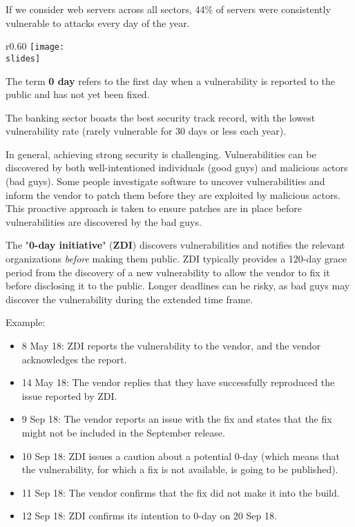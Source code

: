 If we consider web servers across all sectors, 44\% of servers were consistently vulnerable to attacks every day of the year.
\begin{wrapfigure}{r}{0.60\textwidth}
  \centering
      \texttt{[image: \\slides]}
\end{wrapfigure}

The term \textbf{0 day} refers to the first day when a vulnerability is reported to the public and has not yet been fixed.

The banking sector boasts the best security track record, with the lowest vulnerability rate (rarely vulnerable for 30 days or less each year).

In general, achieving strong security is challenging. Vulnerabilities can be discovered by both well-intentioned individuals (good guys) and malicious actors (bad guys). Some people investigate software to uncover vulnerabilities and inform the vendor to patch them before they are exploited by malicious actors. This proactive approach is taken to ensure patches are in place before vulnerabilities are discovered by the bad guys.

The "\textbf{0-day initiative}" (\textbf{ZDI}) discovers vulnerabilities and notifies the relevant organizations \emph{before} making them public. ZDI typically provides a 120-day grace period from the discovery of a new vulnerability to allow the vendor to fix it before disclosing it to the public. Longer deadlines can be risky, as bad guys may discover the vulnerability during the extended time frame.

\vspace{5mm}
Example:
\begin{itemize}
  \item 8 May 18: ZDI reports the vulnerability to the vendor, and the vendor acknowledges the report.
  \item 14 May 18: The vendor replies that they have successfully reproduced the issue reported by ZDI.
  \item 9 Sep 18: The vendor reports an issue with the fix and states that the fix might not be included in the September release.
  \item 10 Sep 18: ZDI issues a caution about a potential 0-day (which means that the vulnerability, for which a fix is not available, is going to be published).
  \item 11 Sep 18: The vendor confirms that the fix did not make it into the build.
  \item 12 Sep 18: ZDI confirms its intention to 0-day on 20 Sep 18.
\end{itemize}






